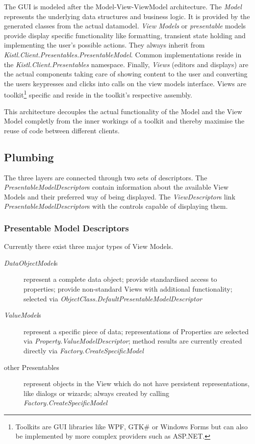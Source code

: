 The GUI is modeled after the Model-View-ViewModel architecture. The
\emph{Model} represents the underlying data structures and business
logic. It is provided by the generated classes from the actual
datamodel. \emph{View Models} or \emph{presentable} models provide
display specific functionality like formatting, transient state holding
and implementing the user's possible actions. They always inherit from
\emph{Kistl.Client.Presentables.PresentableModel}.
Common implementations reside in the
\emph{Kistl.Client.Presentables} namespace. Finally,
\emph{Views} (editors and displays) are the actual components taking
care of showing content to the user and converting the users keypresses
and clicks into calls on the view models interface.  Views are
toolkit\footnote{Toolkits are GUI libraries like WPF, GTK\# or Windows
Forms but can also be implemented by more complex providers such as
ASP.NET.} specific and reside in the toolkit's respective assembly.

This architecture decouples the actual functionality of the Model and
the View Model completly from the inner workings of a toolkit and
thereby maximise the reuse of code between different clients.

\subsection{Plumbing}

The three layers are connected through two sets of descriptors. The
\emph{PresentableModelDescriptor}s contain information about the
available View Models and their preferred way of being displayed. The
\emph{ViewDescriptor}s link \emph{PresentableModelDescriptor}s with
the controls capable of displaying them.

\subsubsection{Presentable Model Descriptors}

Currently there exist three major types of View Models. 

\begin{description}

\item[\emph{DataObjectModel}s]{represent a complete data object;
provide standardised access to properties; provide non-standard Views
with additional functionality; selected via
\emph{ObjectClass.DefaultPresentableModelDescriptor}}

\item[\emph{ValueModel}s]{represent a specific piece of data;
representations of Properties are selected via
\emph{Property.ValueModelDescriptor}; method results are currently
created directly via \emph{Factory.CreateSpecificModel}}

\item[other Presentables]{represent objects in the View which do not
have persistent representations, like dialogs or wizards; always
created by calling \emph{Factory.CreateSpecificModel}}

\end{description} 

